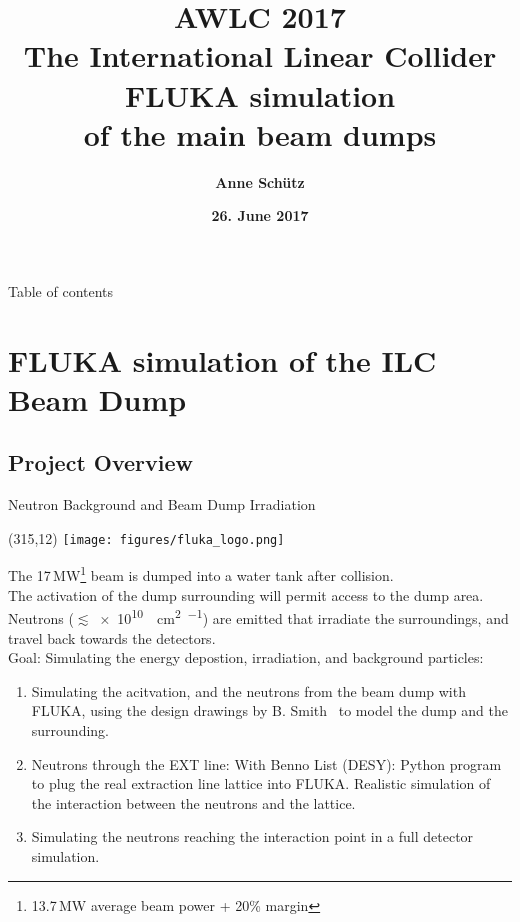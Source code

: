 \documentclass[xcolor={dvipsnames}]{beamer}
\title[Neutrons from the main beam dumps]{\textbf{\alert{AWLC 2017} \\ \vspace*{0.3cm} The International Linear Collider \\ \LARGE FLUKA simulation\\of the main beam dumps}}
\author{\textbf{Anne Sch\"utz}}
\institute{\textbf{DESY}}
\date{\textbf{26. June 2017}}
\newcommand{\flukalogo}{
  \setlength{\TPHorizModule}{1pt}
  \setlength{\TPVertModule}{1pt}
  \begin{textblock}{1}(315,12)
   \texttt{[image: figures/fluka\_logo.png]}
  \end{textblock}
}
\begin{document}
{
\begin{frame}
  \titlepage
\end{frame}
}

\begin{frame}{Table of contents}
  \tableofcontents
\end{frame}



\section{FLUKA simulation of the ILC Beam Dump}
\subsection{Project Overview}
{
\begin{frame}{Neutron Background and Beam Dump Irradiation}
\flukalogo
The 17\,MW\footnote{13.7\,MW average beam power + 20\% margin} beam is dumped into a water tank after collision.\\The activation of the dump surrounding will permit access to the dump area. Neutrons ($\lesssim$\SI{e10}{\per\square\centi\metre\per\year}) are emitted that irradiate the surroundings, and travel back towards the detectors.~\cite{SLAC_FLUKA}\\
\vspace*{0.1cm}
\alert{Goal: Simulating the energy depostion, irradiation, and background particles:}
\begin{enumerate}
 \item Simulating the acitvation, and the neutrons from the beam dump with FLUKA, using the design drawings by B. Smith~\cite{Smith} to model the dump and the surrounding.
 \item Neutrons through the EXT line: With Benno List (DESY): Python program to plug the real extraction line lattice into FLUKA. Realistic simulation of the interaction between the neutrons and the lattice.
 \item Simulating the neutrons reaching the interaction point in a full detector simulation.
\end{enumerate}
\end{frame}
}
\end{document}
